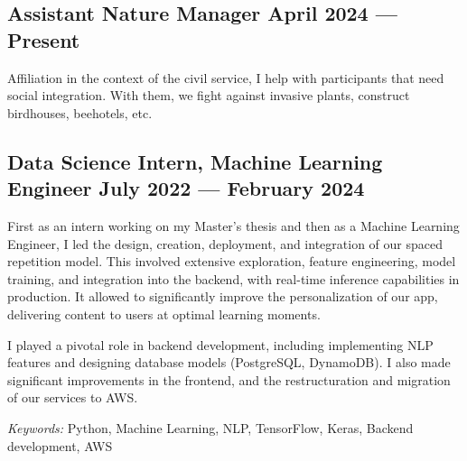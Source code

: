 \subsection{Assistant Nature Manager \hfill April 2024 --- Present}
\vspace{0.7\baselineskip}

Affiliation in the context of the civil service, I help with participants that need social integration. With them, we fight against invasive plants, construct birdhouses, beehotels, etc.

\vspace{0.7\baselineskip}
\subsection{Data Science Intern, Machine Learning Engineer \hfill July 2022 --- February 2024}
\vspace{0.7\baselineskip}

First as an intern working on my Master's thesis and then as a Machine Learning Engineer, I led the design, creation, deployment, and integration of our spaced repetition model. This involved extensive exploration, feature engineering, model training, and integration into the backend, with real-time inference capabilities in production. It allowed to significantly improve the personalization of our app, delivering content to users at optimal learning moments.

I played a pivotal role in backend development, including implementing NLP features and designing database models (PostgreSQL, DynamoDB). I also made significant improvements in the frontend, and the restructuration and migration of our services to AWS.

\vspace{0.2\baselineskip}
\textit{Keywords:} Python, Machine Learning, NLP, TensorFlow, Keras, Backend development, AWS
\vspace{0.7\baselineskip}


